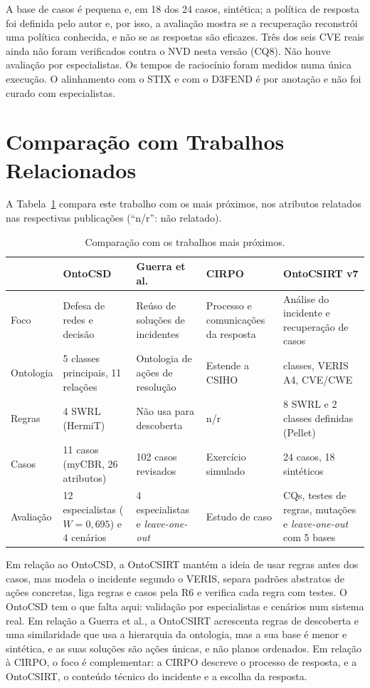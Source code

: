 \documentclass[12pt]{article}
\begin{document}
A base de casos é pequena e, em 18 dos 24 casos, sintética; a política de resposta foi definida pelo autor e, por isso, a avaliação mostra se a recuperação reconstrói uma política conhecida, e não se as respostas são eficazes. Três dos seis CVE reais ainda não foram verificados contra o NVD nesta versão (CQ8). Não houve avaliação por especialistas. Os tempos de raciocínio foram medidos numa única execução. O alinhamento com o STIX e com o D3FEND é por anotação e não foi curado com especialistas.

\section{Comparação com Trabalhos Relacionados}
\label{sec:comp}

A Tabela~\ref{tab:comp} compara este trabalho com os mais próximos, nos atributos relatados nas respectivas publicações (``n/r'': não relatado).

\begin{table}[ht]
\centering\small
\caption{Comparação com os trabalhos mais próximos.}
\label{tab:comp}
\begin{tabularx}{\textwidth}{@{}p{1.75cm}XXXX@{}}
\toprule
 & OntoCSD \cite{wu2024ontocsd} & Guerra et al. \cite{guerra2023} & CIRPO \cite{galadima2026cirpo} & OntoCSIRT v7\\
\midrule
Foco & Defesa de redes e decisão & Reúso de soluções de incidentes & Processo e comunicações da resposta & Análise do incidente e recuperação de casos\\
Ontologia & 5 classes principais, 11 relações & Ontologia de ações de resolução & Estende a CSIHO & \vSevenClasses{} classes, VERIS A4, CVE/CWE\\
Regras & 4 SWRL (HermiT) & Não usa para descoberta & n/r & 8 SWRL e 2 classes definidas (Pellet)\\
Casos & 11 casos (myCBR, 26 atributos) & 102 casos revisados & Exercício simulado & 24 casos, 18 sintéticos\\
Avaliação & 12 especialistas ($W=0{,}695$) e 4 cenários & 4 especialistas e \emph{leave-one-out} & Estudo de caso & CQs, testes de regras, mutações e \emph{leave-one-out} com 5 bases\\
\bottomrule
\end{tabularx}
\end{table}

Em relação ao OntoCSD, a OntoCSIRT mantém a ideia de usar regras antes dos casos, mas modela o incidente segundo o VERIS, separa padrões abstratos de ações concretas, liga regras e casos pela R6 e verifica cada regra com testes. O OntoCSD tem o que falta aqui: validação por especialistas e cenários num sistema real. Em relação a Guerra et al., a OntoCSIRT acrescenta regras de descoberta e uma similaridade que usa a hierarquia da ontologia, mas a sua base é menor e sintética, e as suas soluções são ações únicas, e não planos ordenados. Em relação à CIRPO, o foco é complementar: a CIRPO descreve o processo de resposta, e a OntoCSIRT, o conteúdo técnico do incidente e a escolha da resposta.
\end{document}
